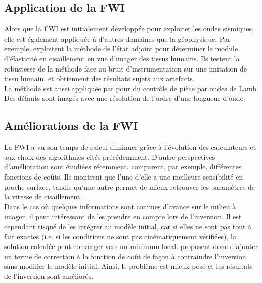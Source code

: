 \documentclass[]{article}
\begin{document}

\subsection*{Application de la FWI}

Alors que la FWI est initialement développée pour exploiter les ondes sismiques, elle est également appliquée à d'autres domaines que la géophysique.
Par exemple, \cite{oberai_03,oberai_04} exploitent la méthode de l'état adjoint pour déterminer le module d'élasticité en cisaillement en vue d'imager des tissus humains. Ils testent la robustesse de la méthode face au bruit d'instrumentation sur une imitation de tissu humain, et obtiennent des résultats sujets aux artefacts. \\



La méthode est aussi appliquée par \cite{rodriguez} pour du contrôle de pièce par ondes de Lamb. Des défauts sont imagés avec une résolution de l'ordre d'une longueur d'onde.


\subsection*{Améliorations de la FWI}
La FWI a vu son temps de calcul diminuer grâce à l'évolution des calculateurs et aux choix des algorithmes cités précédemment. D'autre perspectives d'amélioration sont étudiées récemment. \cite{valensi} comparent, par exemple, différentes fonctions de coûts. Ils montrent que l'une d'elle a une meilleure sensibilité en proche surface, tandis qu'une autre permet de mieux retrouver les paramètres de la vitesse de cisaillement.\\




Dans le cas où quelques informations sont connues d'avance sur le milieu à imager, il peut intéressant de les prendre en compte lors de l'inversion. Il est cependant risqué de les intégrer au modèle initial, car si elles ne sont pas tout à fait exactes (i.e. si les conditions ne sont pas cinématiquement vérifiées), la solution calculée peut converger vers un minimum local. \cite{asnaashari} proposent donc d'ajouter un terme de correction à la fonction de coût de façon à contraindre l'inversion sans modifier le modèle initial. Ainsi, le problème est mieux posé et les résultats de l'inversion sont améliorés.
\end{document}
